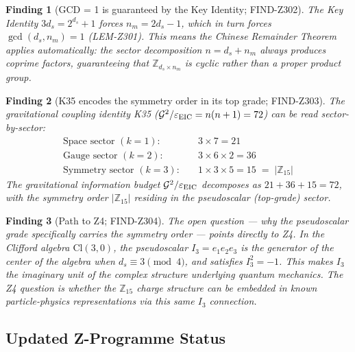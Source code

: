 \documentclass[12pt, a4paper]{article}
\newtheorem{finding}{Finding}[section]
\begin{document}
\begin{finding}[GCD = 1 is guaranteed by the Key Identity; FIND-Z302]
The Key Identity $3d_s = 2^{d_s}+1$ forces $n_m = 2d_s - 1$, which
in turn forces $\gcd(d_s, n_m) = 1$ (LEM-Z301). This means the
Chinese Remainder Theorem applies automatically: the sector
decomposition $n = d_s + n_m$ always produces coprime factors,
guaranteeing that $\mathbb{Z}_{d_s \times n_m}$ is cyclic rather
than a proper product group.
\end{finding}

\begin{finding}[K35 encodes the symmetry order in its top grade;
  FIND-Z303]
The gravitational coupling identity K35
($\mathcal{G}^2/\varepsilon_{\rm EIC} = n(n+1) = 72$) can be read
sector-by-sector:
\begin{align*}
  \text{Space sector } (k=1): &\quad 3 \times 7 = 21 \\
  \text{Gauge sector } (k=2): &\quad 3 \times 6 \times 2 = 36 \\
  \text{Symmetry sector } (k=3): &\quad 1 \times 3 \times 5 = 15
  \;=\; |\mathbb{Z}_{15}|
\end{align*}
The gravitational information budget $\mathcal{G}^2/\varepsilon_{\rm EIC}$
decomposes as $21 + 36 + 15 = 72$, with the symmetry order
$|\mathbb{Z}_{15}|$ residing in the pseudoscalar (top-grade) sector.
\end{finding}

\begin{finding}[Path to Z4; FIND-Z304]
The open question --- why the pseudoscalar grade specifically
carries the symmetry order --- points directly to Z4. In the
Clifford algebra $\mathrm{Cl}(3,0)$, the pseudoscalar
$I_3 = e_1 e_2 e_3$ is the \emph{generator of the center} of the
algebra when $d_s \equiv 3 \pmod{4}$, and satisfies $I_3^2 = -1$.
This makes $I_3$ the imaginary unit of the complex structure
underlying quantum mechanics. The Z4 question is whether the
$\mathbb{Z}_{15}$ charge structure can be embedded in known
particle-physics representations via this same $I_3$ connection.
\end{finding}

\subsection{Updated Z-Programme Status}
\label{sec:status}
\end{document}
